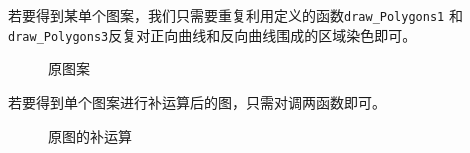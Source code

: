 \documentclass{article}
\begin{document}
	若要得到某单个图案，我们只需要重复利用定义的函数\verb|draw_Polygons1|
	和\verb|draw_Polygons3|反复对正向曲线和反向曲线围成的区域染色即可。
	
	\begin{figure}[!h]
		\centering 
		\caption{原图案}
	\end{figure}

	若要得到单个图案进行补运算后的图，只需对调两函数即可。
	\begin{figure}[!h]
		\centering 
		\caption{原图的补运算}
	\end{figure}
	
\end{document}

